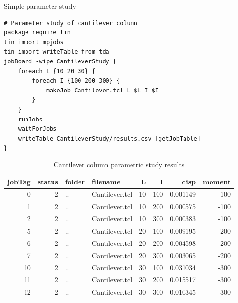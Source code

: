 \documentclass{article}
\renewcommand{\^}[1]{\textsuperscript{#1}}
\renewcommand{\_}[1]{\textsubscript{#1}}
\begin{document}
\begin{example}{Simple parameter study}
\begin{lstlisting}
# Parameter study of cantilever column
package require tin
tin import mpjobs
tin import writeTable from tda
jobBoard -wipe CantileverStudy {
    foreach L {10 20 30} {
        foreach I {100 200 300} {
            makeJob Cantilever.tcl L $L I $I
        }
    }
    runJobs
    waitForJobs
    writeTable CantileverStudy/results.csv [getJobTable]
}
\end{lstlisting}
\end{example}
\begin{table}[htbp]
\centering
\caption{Cantilever column parametric study results}
\begin{tabular}{rrllrrrr}
    \toprule
    jobTag & status & folder & filename       &  L &   I &     disp & moment \\
    \midrule
         0 &      2 & ..     & Cantilever.tcl & 10 & 100 & 0.001149 &   -100 \\
         1 &      2 & ..     & Cantilever.tcl & 10 & 200 & 0.000575 &   -100 \\
         2 &      2 & ..     & Cantilever.tcl & 10 & 300 & 0.000383 &   -100 \\
         5 &      2 & ..     & Cantilever.tcl & 20 & 100 & 0.009195 &   -200 \\
         6 &      2 & ..     & Cantilever.tcl & 20 & 200 & 0.004598 &   -200 \\
         7 &      2 & ..     & Cantilever.tcl & 20 & 300 & 0.003065 &   -200 \\
        10 &      2 & ..     & Cantilever.tcl & 30 & 100 & 0.031034 &   -300 \\
        11 &      2 & ..     & Cantilever.tcl & 30 & 200 & 0.015517 &   -300 \\
        12 &      2 & ..     & Cantilever.tcl & 30 & 300 & 0.010345 &   -300 \\
    \bottomrule
\end{tabular}%
\label{tbl:job_cantilever_results}
\end{table}

\end{document}
